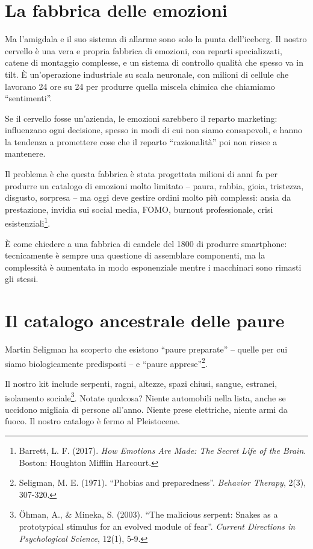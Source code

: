 \section{La fabbrica delle emozioni}

Ma l'amigdala e il suo sistema di allarme sono solo la punta dell'iceberg. Il nostro cervello è una vera e propria fabbrica di emozioni, con reparti specializzati, catene di montaggio complesse, e un sistema di controllo qualità che spesso va in tilt. È un'operazione industriale su scala neuronale, con milioni di cellule che lavorano 24 ore su 24 per produrre quella miscela chimica che chiamiamo ``sentimenti''.

Se il cervello fosse un'azienda, le emozioni sarebbero il reparto marketing: influenzano ogni decisione, spesso in modi di cui non siamo consapevoli, e hanno la tendenza a promettere cose che il reparto ``razionalità'' poi non riesce a mantenere.

Il problema è che questa fabbrica è stata progettata milioni di anni fa per produrre un catalogo di emozioni molto limitato -- paura, rabbia, gioia, tristezza, disgusto, sorpresa -- ma oggi deve gestire ordini molto più complessi: ansia da prestazione, invidia sui social media, FOMO, burnout professionale, crisi esistenziali\footnote{Barrett, L. F. (2017). \textit{How Emotions Are Made: The Secret Life of the Brain}. Boston: Houghton Mifflin Harcourt.}.

È come chiedere a una fabbrica di candele del 1800 di produrre smartphone: tecnicamente è sempre una questione di assemblare componenti, ma la complessità è aumentata in modo esponenziale mentre i macchinari sono rimasti gli stessi.

\section{Il catalogo ancestrale delle paure}

Martin Seligman ha scoperto che esistono ``paure preparate'' -- quelle per cui siamo biologicamente predisposti -- e ``paure apprese''\footnote{Seligman, M. E. (1971). ``Phobias and preparedness''. \textit{Behavior Therapy}, 2(3), 307-320.}. 

Il nostro kit include serpenti, ragni, altezze, spazi chiusi, sangue, estranei, isolamento sociale\footnote{Öhman, A., \& Mineka, S. (2003). ``The malicious serpent: Snakes as a prototypical stimulus for an evolved module of fear''. \textit{Current Directions in Psychological Science}, 12(1), 5-9.}. Notate qualcosa? Niente automobili nella lista, anche se uccidono migliaia di persone all'anno. Niente prese elettriche, niente armi da fuoco. Il nostro catalogo è fermo al Pleistocene.

